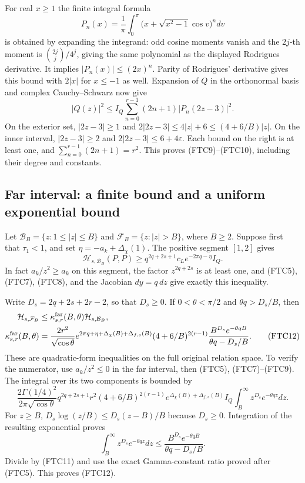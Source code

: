 \documentclass[11pt,a4paper]{article}
\begin{document}
For real $x\ge1$ the finite integral formula
\[
 P_n(x)=\frac1\pi\int_0^\pi
 \bigl(x+\sqrt{x^2-1}\cos v\bigr)^n dv
\]
is obtained by expanding the integrand: odd cosine moments vanish and
the $2j$-th moment is $\binom{2j}{j}/4^j$, giving the same polynomial as
the displayed Rodrigues derivative.  It implies $|P_n(x)|\le(2x)^n$.
Parity of Rodrigues' derivative gives this bound with $2|x|$ for
$x\le-1$ as well.  Expansion of $Q$ in the orthonormal basis and complex
Cauchy--Schwarz now give
\[
 |Q(z)|^2\le I_Q\sum_{n=0}^{r-1}(2n+1)|P_n(2z-3)|^2.
\]
On the exterior set, $|2z-3|\ge1$ and
$2|2z-3|\le4|z|+6\le(4+6/B)|z|$.  On the inner interval,
$|2z-3|\ge2$ and $2|2z-3|\le6+4\varepsilon$.
Each bound on the right is at least one, and
$\sum_{n=0}^{r-1}(2n+1)=r^2$.  This proves (FTC9)--(FTC10), including
their degree and constants.

\subsection{Far interval: a finite bound and a uniform exponential bound}

Let $\mathcal B_B=\{z:1\le|z|\le B\}$ and
$\mathcal F_B=\{z:|z|>B\}$, where $B\ge2$.
Suppose first that $\tau_1<1$, and set
$\eta=-a_k+\Delta_\chi(1)$.  The positive segment $[1,2]$ gives
\begin{equation}
 \mathcal H_{s,\mathcal B_B}(P,P)
 \ge q^{2q+2s+1}c_L e^{-2\pi q-\eta} I_Q.
 \tag{FTC11}
\end{equation}
In fact $a_k/z^2\ge a_k$ on this segment, the factor $z^{2q+2s}$ is at
least one, and (FTC5), (FTC7), (FTC8), and the Jacobian $dy=q\,dz$ give
exactly this inequality.

Write $D_s=2q+2s+2r-2$, so that $D_s\ge0$.  If
$0<\theta<\pi/2$ and $\theta q>D_s/B$, then
\begin{align}
 \mathcal H_{s,\mathcal F_B}&\le\kappa_{s,r}^{\mathrm{far}}(B,\theta)
 \mathcal H_{s,\mathcal B_B},\notag\\
 \kappa_{s,r}^{\mathrm{far}}(B,\theta)
 &=\frac{2r^2}{\sqrt{\cos\theta}}
 e^{2\pi q+\eta+\Delta_\chi(B)+\Delta_{f,s}(B)}
 (4+6/B)^{2(r-1)}
 \frac{B^{D_s}e^{-\theta qB}}{\theta q-D_s/B}.
 \tag{FTC12}
\end{align}
These are quadratic-form inequalities on the full original relation space.
To verify the numerator, use $a_k/z^2\le0$ in the far interval, then
(FTC5), (FTC7)--(FTC9).  The integral over its two components is bounded
by
\[
 \frac{2\Gamma(1/4)^2}{2\pi\sqrt{\cos\theta}}
 q^{2q+2s+1}r^2(4+6/B)^{2(r-1)}
 e^{\Delta_\chi(B)+\Delta_{f,s}(B)}I_Q
 \int_B^\infty z^{D_s}e^{-\theta qz}dz.
\]
For $z\ge B$, $D_s\log(z/B)\le D_s(z-B)/B$ because $D_s\ge0$.
Integration of the resulting exponential proves
\[
 \int_B^\infty z^{D_s}e^{-\theta qz}dz
 \le\frac{B^{D_s}e^{-\theta qB}}{\theta q-D_s/B}.
\]
Divide by (FTC11) and use the exact Gamma-constant ratio proved after
(FTC5).  This proves (FTC12).
\end{document}
